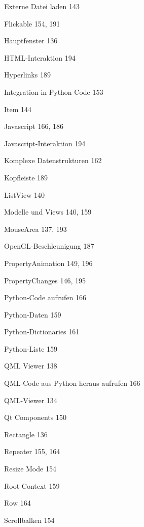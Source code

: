 \documentclass{book}
\renewcommand\subitem{\par}
\begin{document}
\begin{multicols}{2}
\begin{osp-index}
    \subitem Externe Datei laden\hspace{1mm} 143
    \subitem Flickable\hspace{1mm} 154, 191
    \subitem Hauptfenster\hspace{1mm} 136
    \subitem HTML-Interaktion\hspace{1mm} 194
    \subitem Hyperlinks\hspace{1mm} 189
    \subitem Integration in Python-Code\hspace{1mm} 153
    \subitem Item\hspace{1mm} 144
    \subitem Javascript\hspace{1mm} 166, 186
    \subitem Javascript-Interaktion\hspace{1mm} 194
    \subitem Komplexe Datenstrukturen\hspace{1mm} 162
    \subitem Kopfleiste\hspace{1mm} 189
    \subitem ListView\hspace{1mm} 140
    \subitem Modelle und Views\hspace{1mm} 140, 159
    \subitem MouseArea\hspace{1mm} 137, 193
    \subitem OpenGL-Beschleunigung\hspace{1mm} 187
    \subitem PropertyAnimation\hspace{1mm} 149, 196
    \subitem PropertyChanges\hspace{1mm} 146, 195
    \subitem Python-Code aufrufen\hspace{1mm} 166
    \subitem Python-Daten\hspace{1mm} 159
    \subitem Python-Dictionaries\hspace{1mm} 161
    \subitem Python-Liste\hspace{1mm} 159
    \subitem QML Viewer\hspace{1mm} 138
    \subitem QML-Code aus Python heraus aufrufen\hspace{1mm} 166
    \subitem QML-Viewer\hspace{1mm} 134
    \subitem Qt Components\hspace{1mm} 150
    \subitem Rectangle\hspace{1mm} 136
    \subitem Repeater\hspace{1mm} 155, 164
    \subitem Resize Mode\hspace{1mm} 154
    \subitem Root Context\hspace{1mm} 159
    \subitem Row\hspace{1mm} 164
    \subitem Scrollbalken\hspace{1mm} 154

\end{osp-index}
\end{multicols}
\end{document}
